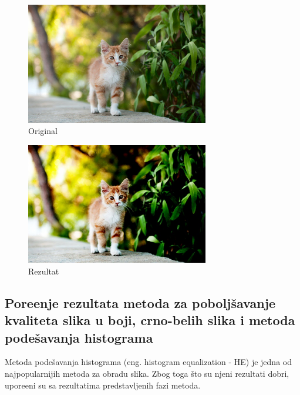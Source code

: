 \documentclass[12pt,a4paper]{article}
\theoremstyle{definition}
\theoremstyle{remark}
\theoremstyle{plain}
\begin{document}
\begin{multicols}{2}
\begin{figure}[H]
\centering
\includegraphics[width=8cm]{images/cat.jpg}
  \caption{Original}\label{river}
\end{figure}
\columnbreak
\begin{figure}[H]
\centering
\includegraphics[width=8cm]{images/fuzzy_color_5.jpg}
  \caption{Rezultat}\label{cat_output}
\end{figure}
\end{multicols}

\subsection{Pore\dj enje rezultata metoda za pobolj\v savanje kvaliteta slika u boji, crno-belih slika i metoda pode\v savanja histograma}
Metoda pode\v savanja histograma (eng. histogram equalization - HE) je jedna od najpopularnijih metoda za obradu slika. 
Zbog toga \v sto su njeni rezultati dobri, upore\dj eni su sa rezultatima predstavljenih fazi metoda. \\  
\end{document}

